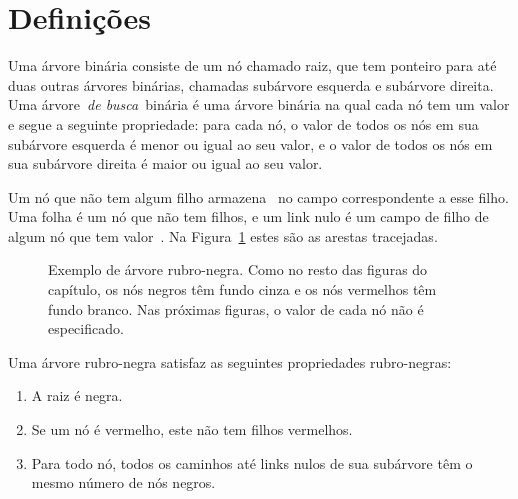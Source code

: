 \documentclass[main.tex]{subfiles}
\begin{document}
\section{Definições}


Uma árvore binária consiste de um nó chamado raiz, que tem ponteiro para até duas outras árvores binárias, chamadas subárvore esquerda e subárvore direita. Uma árvore~\emph{de busca}~binária é uma árvore binária na qual cada nó tem um valor e segue a seguinte propriedade: para cada nó, o valor de todos os nós em sua subárvore esquerda é menor ou igual ao seu valor, e o valor de todos os nós em sua subárvore direita é maior ou igual ao seu valor.

Um nó que não tem algum filho armazena~ no campo correspondente a esse filho. Uma folha é um nó que não tem filhos, e um link nulo é um campo de filho de algum nó que tem valor~. Na Figura~\ref{fig:arv_bin_ex} estes são as arestas tracejadas.


\begin{figure}
\centering
{}
\caption{Exemplo de árvore rubro-negra. Como no resto das figuras do capítulo, os nós negros têm fundo cinza e os nós vermelhos têm fundo branco. Nas próximas figuras, o valor de cada nó não é especificado.} \label{fig:arv_bin_ex}
\end{figure}

Uma árvore rubro-negra satisfaz as seguintes propriedades rubro-negras:
\begin{enumerate}
\item A raiz é negra.
\item Se um nó é vermelho, este não tem filhos vermelhos.
\item Para todo nó, todos os caminhos até links nulos de sua subárvore têm o mesmo número de nós negros.
\end{enumerate}
\end{document}
